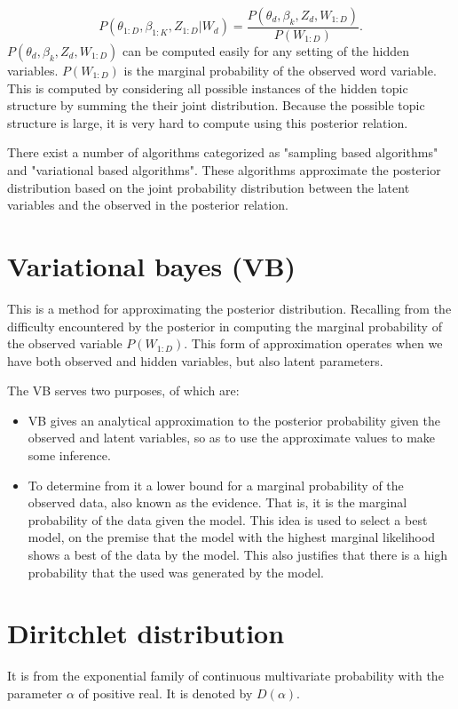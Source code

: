 $$P(\theta_{1:D},\beta_{1:K},Z_{1:D}|W_d)=\frac{P(\theta_d,\beta_k,Z_d,W_{1:D})}{P(W_{1:D})}\text{.}$$
$P(\theta_d,\beta_k,Z_d,W_{1:D})$ can be computed easily for any setting of the hidden variables. $P(W_{1:D})$ is the marginal probability of the observed word variable. This is computed by considering all possible instances of the hidden topic structure by summing the their joint distribution. Because the possible topic structure is large, it is very hard to compute using this posterior relation.

There exist a number of algorithms categorized as "sampling based algorithms" and "variational based algorithms". These algorithms approximate the posterior distribution based on the joint probability distribution between the latent variables and the observed in the posterior relation.

\section{Variational bayes (VB)}
This is a method for approximating the posterior distribution. Recalling from the difficulty encountered by the posterior in computing the marginal probability of the observed variable $P(W_{1:D})$. This form of approximation operates when we have both observed and hidden variables, but also latent parameters.

The VB serves two purposes, of which are:
\begin{itemize}
\item VB gives an analytical approximation to the posterior probability given the observed and latent variables, so as to use the approximate values to make some inference.
\item To determine from it a lower bound for a marginal probability of the observed data, also known as the evidence. That is, it is the marginal probability of the data given the model. 
This idea is used to select a best model, on the premise that the model with the highest marginal likelihood shows a best of the data by the model. This also justifies that there is a high probability that the used was generated by the model.
\end{itemize}
\section{Diritchlet distribution}
It is from the exponential family of continuous multivariate probability with the parameter $\alpha$ of positive real. It is denoted by $D(\alpha)$.

